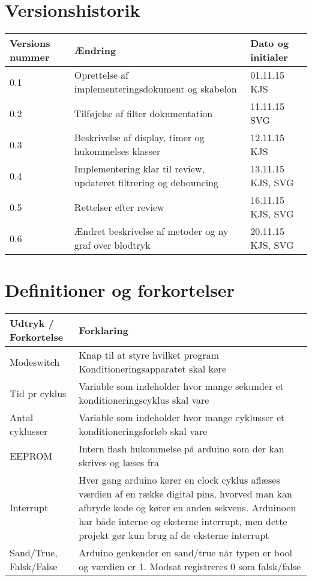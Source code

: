 	\newpage
	\section{Versionshistorik}
	\begin{longtable}{ |p{} |p{}| p{}|  } 
		\hline
		\rowcolor{usDef}
		\textbf{Versions nummer} &  \textbf{Ændring} & \textbf{Dato og initialer} \\
		\hline
		0.1 & Oprettelse af implementeringsdokument og skabelon & 01.11.15 KJS \\
		\hline
		0.2 & Tilføjelse af filter dokumentation & 11.11.15 SVG \\
		\hline
		0.3 & Beskrivelse af display, timer og hukommelses klasser & 12.11.15 KJS \\
		\hline
		0.4 &  Implementering klar til review, updateret filtrering og debouncing & 13.11.15 KJS, SVG \\
		\hline
		0.5 &  Rettelser efter review & 16.11.15 KJS, SVG \\
		\hline
		0.6 &  Ændret beskrivelse af metoder og ny graf over blodtryk & 20.11.15 KJS, SVG \\
		\hline
	\end{longtable}
	
	\section{Definitioner og forkortelser}
	\begin{longtable}{ |p{} |p{}| } 
		\hline
		\textbf{Udtryk / Forkortelse} &  \textbf{Forklaring} \\
		\hline
		Modeswitch & Knap til at styre hvilket program Konditioneringsapparatet skal køre \\
		\hline
		Tid pr cyklus & Variable som indeholder hvor mange sekunder et konditioneringscyklus skal vare \\
		\hline
		Antal cyklusser & Variable som indeholder hvor mange cyklusser et konditioneringsforløb skal vare \\
		\hline
		EEPROM & Intern flash hukommelse på arduino som der kan skrives og læses fra \\
		\hline
		Interrupt & Hver gang arduino kører en clock cyklus aflæses værdien af en række digital pins, hvorved man kan afbryde kode og kører en anden sekvens. Arduinoen har både interne og eksterne interrupt, men dette projekt gør kun brug af de eksterne interrupt \\
		\hline
		Sand/True, Falsk/False & Arduino genkender en sand/true når typen er bool og værdien er 1. Modsat registreres 0 som falsk/false \\
		\hline
	\end{longtable}